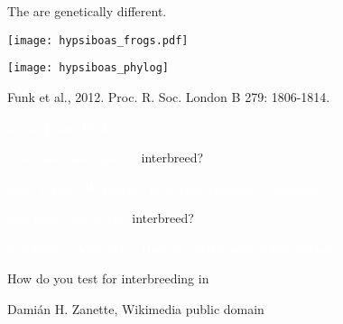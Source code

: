 \documentclass[t]{beamer}
\begin{document}
\begin{frame}{The  are genetically different.}

	\vspace*{-0.5\baselineskip}
	
	\centering
	\begin{multicols}{2}
	
		\texttt{[image: hypsiboas\_frogs.pdf]} \vfill
	
	\columnbreak
	
		\texttt{[image: hypsiboas\_phylog]} \vfill
	
	\end{multicols}

	\vfilll

	\hfill \tiny Funk et al., 2012. Proc. R. Soc. London B 279: 1806-1814.

\end{frame}
%
{
\begin{frame}[b]

	\hfill \tiny \textcolor{white}{Liam Quinn, Flickr }

\end{frame}
}
%
{
\begin{frame}[b]{\textcolor{white}{Can these sister species} \textcolor{orange5}{interbreed?}}

	\tiny\textcolor{white}{Alan Vernon, Wikimedia  \hfill Francesco Veronesi, Wikimedia, }
\end{frame}
}
%
{
\begin{frame}[b]{\textcolor{white}{Can these two species} \textcolor{orange5}{interbreed?}}

	\tiny\textcolor{white}{Rainbirder, Wikimedia,  \hfill Daderot, Wikimedia public domain}
\end{frame}
}
%
{
\begin{frame}[b]{How do you test for interbreeding in }

	\tiny Damián H. Zanette, Wikimedia public domain

\end{frame}
}
\end{document}
